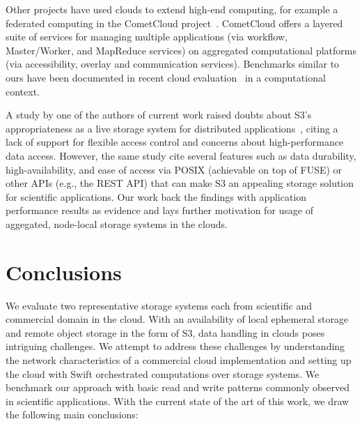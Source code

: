\documentclass[10pt,journal,cspaper,compsoc]{IEEEtran}
\begin{document}
Other projects have used clouds to extend high-end computing, for example a
federated computing in the CometCloud project~\cite{cometcloud_web}. CometCloud
offers a layered suite of services for managing multiple applications (via
workflow, Master/Worker, and MapReduce services) on aggregated computational
platforms (via accessibility, overlay and communication services).  Benchmarks
similar to ours have been documented in recent cloud
evaluation~\cite{cloudefficacy} in a computational context.

A study by one of the authors of current work raised doubts about S3's
appropriateness as a live storage system for distributed
applications~\cite{s3-viable}, citing a lack of support for flexible access
control and concerns about high-performance data access. However, the same
study cite several features such as data durability, high-availability, and
ease of access via POSIX (achievable on top of FUSE) or other APIs (e.g., the
REST API) that can make S3 an appealing storage solution for scientific
applications. Our work back the findings with application performance results
as evidence and lays further motivation for usage of aggegated, node-local
storage systems in the clouds.


\section{Conclusions}\label{sec:concl}
We evaluate two representative storage systems each from scientific and
commercial domain in the cloud. With an availability of local ephemeral storage
and remote object storage in the form of S3, data handling in clouds poses
intriguing challenges.  We attempt to address these challenges by understanding
the network characteristics of a commercial cloud implementation and setting up
the cloud with Swift orchestrated computations over storage systems. We
benchmark our approach with basic read and write patterns commonly observed in
scientific applications. With the current state of the art of this work, we
draw the following main conclusions:
\end{document}
